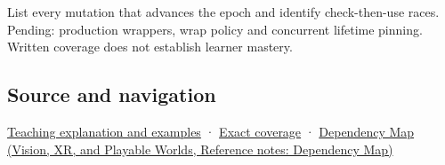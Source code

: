 List every mutation that advances the epoch and identify check-then-use races. Pending: production wrappers, wrap policy and concurrent lifetime pinning. Written coverage does not establish learner mastery.

\subsection{Source and navigation}\label{appendix-aa405b7c3903-source-and-navigation}

\hyperref[01-foundations-i-ch003-when-a-valid-borrow-stops-naming-the-intended-thing]{Teaching explanation and examples} · \hyperref[appendix-fd090d982a15-m008---parts-113-126]{Exact coverage} · \href{../07-Vision-XR-and-Playable-Worlds/main.pdf\#nameddest=appendix-4ad47bdd269a}{Dependency Map (Vision, XR, and Playable Worlds, Reference notes: Dependency Map)}
